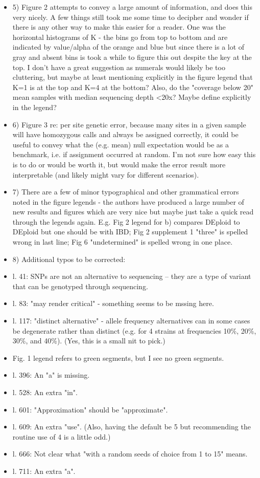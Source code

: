 \documentclass[11pt,twoside,a4paper]{article}
\begin{document}
\begin{itemize}
    \item 5) Figure 2 attempts to convey a large amount of information, and does this very nicely. A few things still took me some time to decipher and wonder if there is any other way to make this easier for a reader. One was the horizontal histograms of K - the bins go from top to bottom and are indicated by value/alpha of the orange and blue but since there is a lot of gray and absent bins is took a while to figure this out despite the key at the top. I don't have a great suggestion as numerals would likely be too cluttering, but maybe at least mentioning explicitly in the figure legend that K=1 is at the top and K=4 at the bottom? Also, do the "coverage below 20" mean samples with median sequencing depth <20x? Maybe define explicitly in the legend? 

    \item 6) Figure 3 re: per site genetic error, because many sites in a given sample will have homozygous calls and always be assigned correctly, it could be useful to convey what the (e.g. mean) null expectation would be as a benchmark, i.e. if assignment occurred at random. I'm not sure how easy this is to do or would be worth it, but would make the error result more interpretable (and likely might vary for different scenarios). 

    \item 7) There are a few of minor typographical and other grammatical errors noted in the figure legends - the authors have produced a large number of new results and figures which are very nice but maybe just take a quick read through the legends again. E.g. Fig 2 legend for b) compares DEploid to DEploid but one should be with IBD; Fig 2 supplement 1 "three" is spelled wrong in last line; Fig 6 "undetermined" is spelled wrong in one place. 

    \item 8) Additional typos to be corrected: 

\item l. 41: SNPs are not an alternative to sequencing -- they are a type of variant that can be genotyped through sequencing. 
\item l. 83: "may render critical" - something seems to be mssing here. 
\item l. 117: "distinct alternative" - allele frequency alternatives can in some cases be degenerate rather than distinct (e.g. for 4 strains at frequencies 10\%, 20\%, 30\%, and 40\%). (Yes, this is a small nit to pick.) 
\item Fig. 1 legend refers to green segments, but I see no green segments. 
\item l. 396: An "a" is missing. 
\item l. 528: An extra "in". 
\item l. 601: "Approximation" should be "approximate". 
\item l. 609: An extra "use". (Also, having the default be 5 but recommending the routine use of 4 is a little odd.) 
\item l. 666: Not clear what "with a random seeds of choice from 1 to 15" means. 
\item l. 711: An extra "a". 
\end{itemize}
\end{document}
